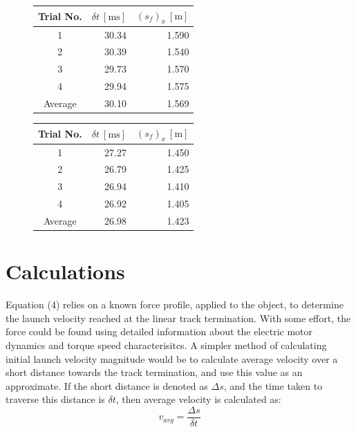 \documentclass[a4paper]{article}
\begin{document}
\begin{figure}[h]
	\begin{minipage}{0.45\textwidth}
		\centering
		\begin{tabular}{crr}
			\toprule
			Trial No. & $\delta t \ [\si{\milli\second}]$ & $(s_f)_x \ [\si{\meter}]$\\
			\midrule
			1 & 30.34 & 1.590\\
			2 & 30.39 & 1.540\\
			3 & 29.73 & 1.570\\
			4 & 29.94 & 1.575\\
			\midrule
			Average & 30.10 & 1.569 \\
			\bottomrule
		\end{tabular}
	\end{minipage}
	\hspace{1cm}
	\begin{minipage}{0.45\textwidth}
		\centering
		\begin{tabular}{crr}
			\toprule
			Trial No. & $\delta t \ [\si{\milli\second}]$ & $(s_f)_x \ [\si{\meter}]$\\
			\midrule
			1 & 27.27 & 1.450\\
			2 & 26.79 & 1.425\\
			3 & 26.94 & 1.410\\
			4 & 26.92 & 1.405\\
			\midrule
			Average & 26.98 & 1.423 \\
			\bottomrule
		\end{tabular}
	\end{minipage}
\end{figure}

\newpage

\section{Calculations}
Equation (4) relies on a known force profile, applied to the object, to determine the launch velocity reached at the linear track termination. With some effort, the force could be found using detailed information about the electric motor dynamics and torque speed characterisitcs. A simpler method of calculating initial launch velocity magnitude would be to calculate average velocity over a short distance towards the track termination, and use this value as an approximate. If the short distance is denoted as $\Delta s$, and the time taken to traverse this distance is $\delta t$, then average velocity is calculated as:
\begin{equation}
v_{avg} = \frac{\Delta s}{\delta t}
\end{equation}
\end{document}
